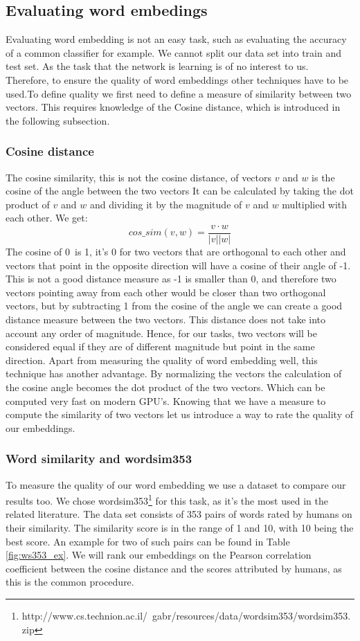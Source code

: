 \subsection{Evaluating word embedings}
Evaluating word embedding is not an easy task, such as evaluating the accuracy of a common classifier for example. We cannot split our data set into train and test set. As the task that the network is learning is of no interest to us. Therefore, to ensure the quality of word embeddings other techniques have to be used.To define quality we first need to define a measure of similarity between two vectors. This requires knowledge of the Cosine distance, which is introduced in the following subsection.
\subsubsection{Cosine distance}
The cosine similarity, this is not the cosine distance, of vectors $v$ and $w$ is the cosine of the angle between the two vectors It can be calculated by taking the dot product of $v$ and $w$ and dividing it by the magnitude of $v$ and $w$ multiplied with each other. We get:
\begin{equation}
cos\_sim(v,w) = \frac{v \cdot w}{|v| |w|}
\end{equation}
The cosine of 0\textdegree ~is 1, it's 0 for two vectors that are orthogonal to each other and vectors that point in the opposite direction will have a cosine of their angle of -1. This is not a good distance measure as -1 is smaller than 0, and therefore two vectors pointing away from each other would be closer than two orthogonal vectors, but by subtracting 1 from the cosine of the angle we can create a good distance measure between the two vectors. This distance does not take into account any order of magnitude. Hence, for our tasks, two vectors will be considered equal if they are of different magnitude but point in the same direction.
Apart from measuring the quality of word embedding well, this technique has another advantage. By normalizing the vectors the calculation of the cosine angle becomes the dot product of the two vectors. Which can be computed very fast on modern GPU's.
Knowing that we have a measure to compute the similarity of two vectors let us introduce a way to rate the quality of our embeddings.

\subsubsection{Word similarity and wordsim353}
To measure the quality of our word embedding we  use a dataset to compare our results too. We chose wordsim353\footnote{http://www.cs.technion.ac.il/~gabr/resources/data/wordsim353/wordsim353.zip} for this task, as it's the most used in the related literature. The data set consists of 353 pairs of words rated by humans on their similarity. The similarity score is in the range of 1 and 10, with 10 being the best score. An example for two of such pairs can be found in Table \ref{fig:ws353_ex}. We will rank our embeddings on the Pearson correlation coefficient between the cosine distance and the scores attributed by humans, as this is the common procedure.

